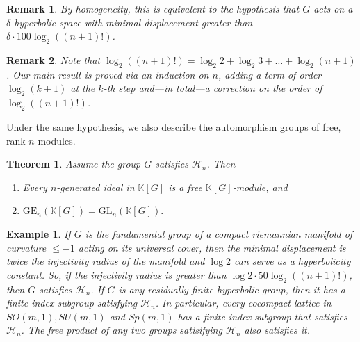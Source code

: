 \documentclass[11pt,letterpaper]{amsart}
\newtheorem{theorem}{Theorem}
\newtheorem*{example}{Example}
\newtheorem*{remark}{Remark}
\begin{document}
\vspace{0.3cm}
\begin{remark}
By homogeneity, this is equivalent to the hypothesis that $G$ acts on a $\delta$-hyperbolic space with minimal displacement greater than $\delta\cdot 100\log_2((n+1)!)$.
\end{remark}
\begin{remark}
Note that $\log_2((n+1)!)=\log_2 2+\log_2 3+\dots+\log_2(n+1)$. 
Our main result is proved via an induction on $n$, adding a term of order $\log_2(k+1)$ at the $k$-th step and---in total---a correction on the order of $\log_2((n+1)!)$.
\end{remark}
Under the same hypothesis, we also describe the automorphism groups of free, rank $n$ modules.
\begin{theorem}
\label{mainfirtheorem}
Assume the group $G$ satisfies $\mathcal H_{n}$. Then 
\begin{enumerate}
\item[1.]
Every $n$-generated ideal in $\mathbb K[G]$ is a free $\mathbb K[G]$-module, and 
\item[2.]
$
\mathrm{GE}_n(\mathbb K[G])=\mathrm{GL}_n(\mathbb K[G]).
$
\end{enumerate}
\end{theorem}
\begin{example} 
If $G$ is the fundamental group of a compact riemannian manifold of curvature $\leq -1$ acting on its universal cover, then the minimal displacement is twice the injectivity radius of the manifold and $\log 2$ can serve as a hyperbolicity constant. So, if the injectivity radius is greater than $\log 2\cdot 50\log_2((n+1)!)$, then $G$ satisfies $\mathcal H_{n}$. If $G$ is any residually finite hyperbolic group, then it has a finite index subgroup satisfying $\mathcal H_{n}$. In particular, every cocompact lattice in $SO(m,1),SU(m,1)$ and $Sp(m,1)$ has a finite index subgroup that satisfies $\mathcal H_n$. The free product of any two groups satisifying ${\mathcal{H}_{n}} $ also satisfies it. 
\end{example}
\end{document}
